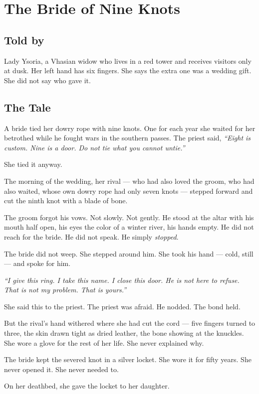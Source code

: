 \chapter{The Bride of Nine Knots}

\section*{Told by}
Lady Ysoria, a Vhasian widow who lives in a red tower and receives visitors only at dusk. Her left hand has six fingers. She says the extra one was a wedding gift. She did not say who gave it.

\section*{The Tale}

A bride tied her dowry rope with nine knots. One for each year she waited for her betrothed while he fought wars in the southern passes. The priest said, \textit{``Eight is custom. Nine is a door. Do not tie what you cannot untie.''}

She tied it anyway.

The morning of the wedding, her rival — who had also loved the groom, who had also waited, whose own dowry rope had only seven knots — stepped forward and cut the ninth knot with a blade of bone.

The groom forgot his vows. Not slowly. Not gently. He stood at the altar with his mouth half open, his eyes the color of a winter river, his hands empty. He did not reach for the bride. He did not speak. He simply \textit{stopped}.

The bride did not weep. She stepped around him. She took his hand — cold, still — and spoke for him.

\textit{``I give this ring. I take this name. I close this door. He is not here to refuse. That is not my problem. That is yours.''}

She said this to the priest. The priest was afraid. He nodded. The bond held.

But the rival's hand withered where she had cut the cord — five fingers turned to three, the skin drawn tight as dried leather, the bone showing at the knuckles. She wore a glove for the rest of her life. She never explained why.

The bride kept the severed knot in a silver locket. She wore it for fifty years. She never opened it. She never needed to.

On her deathbed, she gave the locket to her daughter.

